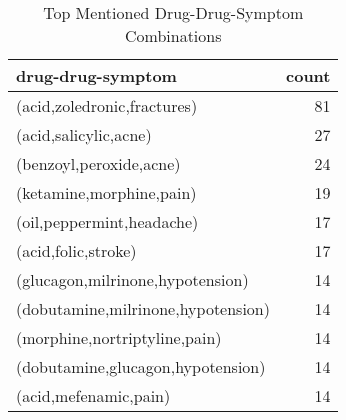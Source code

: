 \documentclass[letterpaper]{article}
\begin{document}
\begin{table}
\begin{tabular}{lr}
\hline
drug-drug-symptom & count \\
\hline
(acid,zoledronic,fractures) & 81\\
(acid,salicylic,acne) & 27\\
(benzoyl,peroxide,acne) & 24\\
(ketamine,morphine,pain) & 19\\
(oil,peppermint,headache) & 17\\
(acid,folic,stroke) & 17\\
(glucagon,milrinone,hypotension) & 14\\
(dobutamine,milrinone,hypotension) & 14\\
(morphine,nortriptyline,pain) & 14\\
(dobutamine,glucagon,hypotension) & 14\\
(acid,mefenamic,pain) & 14\\
\hline
\end{tabular}
\label{TabcoCoDrugSymptomCount}
\caption{Top Mentioned Drug-Drug-Symptom Combinations}
\end{table}
%
%
        
\end{document}
